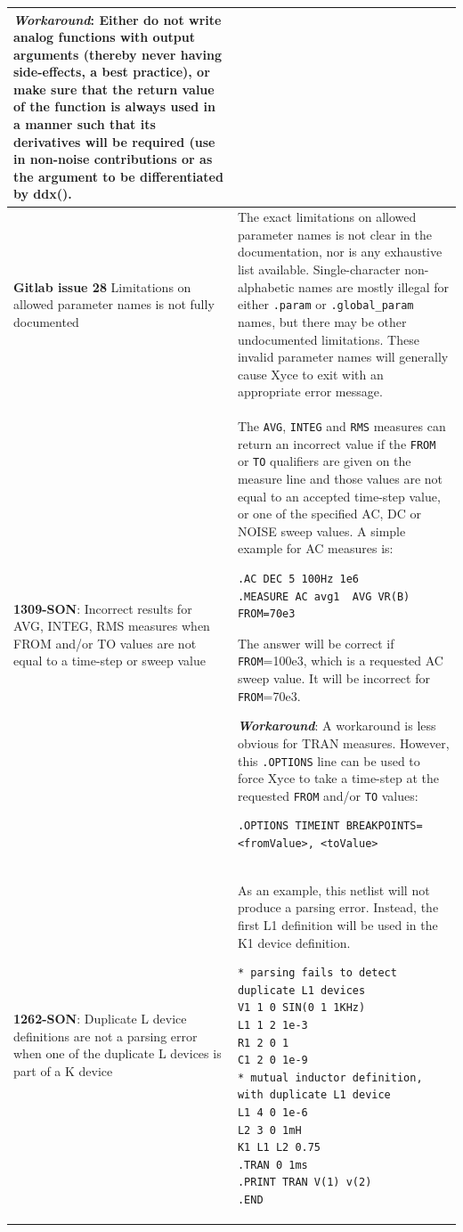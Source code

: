 {\begin{longtable}[h] {>{\raggedright\small}m{2in}|>{\raggedright\let\\\tabularnewline\small}m{3.5in}}
\textbf{\textit{Workaround}}:
Either do not write analog functions with output arguments (thereby
never having side-effects, a best practice), or make sure that the
return value of the function is always used in a manner such that its
derivatives will be required (use in non-noise contributions or as
the argument to be differentiated by ddx().

\\ \hline

\textbf{Gitlab issue 28} Limitations on allowed parameter names is not fully documented &
The exact limitations on allowed parameter names is not clear in the
documentation, nor is any exhaustive list available.  Single-character
non-alphabetic names are mostly illegal for either \texttt{.param}
or \texttt{.global\_param} names, but there may be other undocumented
limitations.  These invalid parameter names will generally cause Xyce
to exit with an appropriate error message.  \\ \hline

\textbf{1309-SON}: Incorrect results for AVG, INTEG, RMS measures when FROM
and/or TO values are not equal to a time-step or sweep value & The \texttt{AVG},
\texttt{INTEG} and \texttt{RMS} measures can return an incorrect value if
the \texttt{FROM} or \texttt{TO} qualifiers are given on the measure line
and those values are not equal to an accepted time-step value, or one of
the specified AC, DC or NOISE sweep values.  A simple example for AC measures
is:
\begin{verbatim}
.AC DEC 5 100Hz 1e6
.MEASURE AC avg1  AVG VR(B) FROM=70e3
\end{verbatim}
The answer will be correct if \texttt{FROM}=100e3, which is a requested
AC sweep value. It will be incorrect for \texttt{FROM}=70e3.

\textbf{\textit{Workaround}}:
A workaround is less obvious for TRAN measures.  However, this \texttt{.OPTIONS}
line can be used to force Xyce to take a time-step at the requested \texttt{FROM}
and/or \texttt{TO} values:
\begin{verbatim}
.OPTIONS TIMEINT BREAKPOINTS=<fromValue>, <toValue>
\end{verbatim}
\\ \hline

\textbf{1262-SON}: Duplicate L device definitions are not a parsing error
when one of the duplicate L devices is part of a K device &
As an example, this netlist will not produce a parsing error.  Instead,
the first L1 definition will be used in the K1 device definition.
\begin{verbatim}
* parsing fails to detect duplicate L1 devices
V1 1 0 SIN(0 1 1KHz)
L1 1 2 1e-3
R1 2 0 1
C1 2 0 1e-9
* mutual inductor definition, with duplicate L1 device
L1 4 0 1e-6
L2 3 0 1mH
K1 L1 L2 0.75
.TRAN 0 1ms
.PRINT TRAN V(1) v(2)
.END
\end{verbatim}


\end{longtable}}
